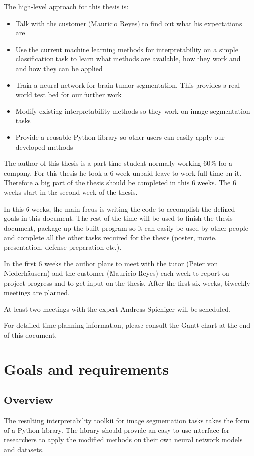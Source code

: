 The high-level approach for this thesis is:
\begin{itemize}
    \item Talk with the customer (Mauricio Reyes) to find out what his expectations are
    \item Use the current machine learning methods for interpretability on a simple classification task to learn what methods are available, how they work and and how they can be applied
    \item Train a neural network for brain tumor segmentation. This provides a real-world test bed for our further work
    \item Modify existing interpretability methods so they work on image segmentation tasks
    \item Provide a reusable Python library so other users can easily apply our developed methods
\end{itemize}

The author of this thesis is a part-time student normally working 60\% for a company. For this thesis he took a 6 week unpaid leave to work full-time on it.
Therefore a big part of the thesis should be completed in this 6 weeks. The 6 weeks start in the second week of the thesis.

In this 6 weeks, the main focus is writing the code to accomplish the defined goals in this document. The rest of the time will be used to finish the thesis document, package up the built program so it can easily be used by other people and complete all the other tasks required for the thesis (poster, movie, presentation, defense preparation etc.).

In the first 6 weeks the author plans to meet with the tutor (Peter von Niederhäusern) and the customer (Mauricio Reyes) each week to report on project progress and to get input on the thesis.
After the first six weeks, biweekly meetings are planned.

At least two meetings with the expert Andreas Spichiger will be scheduled.

For detailed time planning information, please consult the Gantt chart at the end of this document.

\section{Goals and requirements}

\subsection{Overview}
The resulting interpretability toolkit for image segmentation tasks takes the form of a Python library. The library should provide an easy to use interface for researchers to apply
the modified methods on their own neural network models and datasets.

